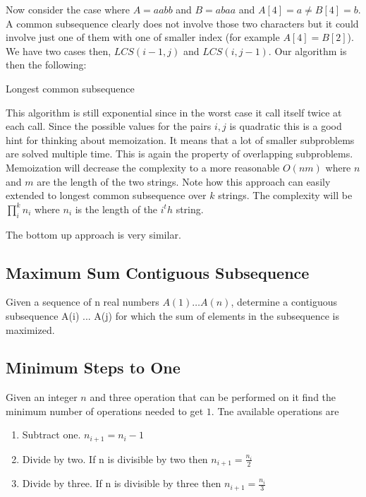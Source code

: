 Now consider the case where $A=aabb$ and $B=abaa$ and $A[4]=a \neq  B[4]=b$. A common subsequence clearly does not involve those two characters but it could involve just one of them with one of smaller index (for example $A[4] = B[2]$). We have two cases then, $LCS(i-1,j)$ and $LCS(i,j-1)$.
Our algorithm is then the following:
 \begin{algorithm}\label{alg:dagshortest}
\caption{Longest common subsequence}
\end{algorithm}
This algorithm is still exponential since in the worst case it call itself twice at each call. Since the possible values for the pairs $i,j$ is quadratic this is a good hint for thinking about memoization. It means that a lot of smaller subproblems are solved multiple time. This is again the property of overlapping subproblems. Memoization will decrease the complexity to a more reasonable $O(nm)$ where $n$ and $m$ are the length of the two strings. Note how this approach can easily extended to longest common subsequence over $k$ strings. The complexity will be $\prod_i^k n_i$ where $n_i$ is the length of the $i^th$ string.

The bottom up approach is very similar. 


\subsection{Maximum Sum Contiguous Subsequence}
Given a sequence of n real numbers $A(1) \ldots A(n)$, determine a contiguous subsequence A(i) ... A(j) for which the sum of elements in the subsequence is maximized.



\subsection{Minimum Steps to One}
Given an integer $n$ and three operation that can be performed on it find the minimum number of operations needed to get $1$. Tne available operations are
\begin{enumerate}
\item Subtract one. $n_{i+1}=n_{i}-1$
\item Divide by two. If n is divisible by two then $n_{i+1}=\frac{n_{i}}{2}$
\item Divide by three. If n is divisible by three then $n_{i+1}=\frac{n_{i}}{3}$
\end{enumerate}

